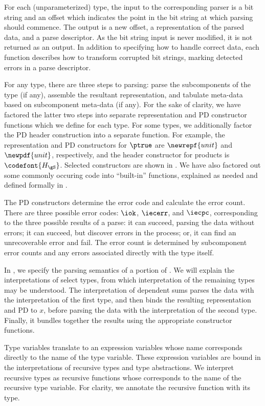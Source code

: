 For each (unparameterized) type, the input to the corresponding parser
is a bit string and an offset which indicates the point in the bit
string at which parsing should commence.  The output is a new offset,
a representation of the parsed data, and a parse descriptor. As the
bit string input is never modified, it is not returned as an output.
In addition to specifying how to handle correct data, each function
describes how to transform corrupted bit strings, marking detected
errors in a parse descriptor.

For any type, there are three steps to parsing: parse the
subcomponents of the type (if any), assemble the resultant
representation, and tabulate meta-data based on subcomponent meta-data
(if any). For the sake of clarity, we have factored the latter two
steps into separate representation and PD constructor functions which
we define for each type. For some types, we additionally factor the PD
header construction into a separate function. For example, the
representation and PD constructors for $\ptrue$ are $\newrepf {unit}$
and $\newpdf {unit}$, respectively, and the header constructor for
products is ${\codefont{H_{\gS}}}$. Selected constructors are shown in
. We have also factored out some commonly
occuring code into ``built-in'' functions, explained as needed and
defined formally in .

The PD constructors determine the error code and calculate the error
count.  There are three possible error codes: $\iok$, $\iecerr$, and
$\iecpc$, corresponding to the three possible results of a parse: it
can succeed, parsing the data without errors; it can succeed, but
discover errors in the process; or, it can find an unrecoverable error
and fail.  The error count is determined by subcomponent error counts
and any errors associated directly with the type itself.

In , we specify the parsing semantics of a portion
of \ddc{}. We will explain the interpretations of select types, from
which interpretation of the remaining types may be understood. The
interpretation of dependent sums parses the data with the
interpretation of the first type, and then binds the resulting
representation and PD to $x$, before parsing the data with the
interpretation of the second type. Finally, it bundles together the
results using the appropriate constructor functions.

Type variables translate to an expression variables whose name
corresponds directly to the name of the type variable. These
expression variables are bound in the interpretations of recursive
types and type abstractions. We interpret recursive types as recursive
functions whose corresponds to the name of the recursive type
variable. For clarity, we annotate the recursive function with its
type.

